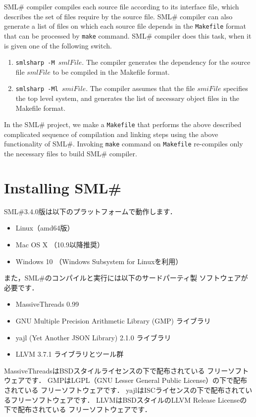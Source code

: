 \documentclass{jbook}
\newcommand{\txt}[2]{#2}
\newcommand{\smlsharp}{SML\#}
\newcommand{\version}{3.4.0}
\begin{document}
	\smlsharp{} compiler compiles each source file according to its
interface file, which describes the set of files require by the source
file.
	\smlsharp{} compiler can also generate a list of files on which
each source file depends in the {\tt Makefile} format that can be
processed by {\tt make} command. 
	\smlsharp{} compiler does this task, when it is given one of the
following switch.

\begin{enumerate}
\item {\tt smlsharp -M $\mathit{smlFile}$}.
	The compiler generates the dependency for the source file
$\mathit{smlFile}$ to be compiled in the Makefile format. 
\item {\tt smlsharp -Ml $\mathit{smiFile}$}.
	The compiler assumes that the file $\mathit{smiFile}$ specifies the
top level system, and generates the list of necessary object files in the
Makefile format. 
\end{enumerate}	

	In the \smlsharp{} project, we make a {\tt Makefile} that
performs the above described complicated sequence of compilation and
linking steps using the above functionality of \smlsharp{}.
	Invoking {\tt make} command on {\tt Makefile} re-compiles only
the necessary files to build \smlsharp{} compiler.
\fi%

\section{
\txt{\smlsharp{}のインストール}
    {Installing \smlsharp{}}}
\label{sec:tutorialInstall}

\ifjp%
	\smlsharp{}\version{}版は以下のプラットフォームで動作します．
\begin{itemize}
\item Linux（amd64版）
\item Mac OS X （10.9以降推奨）
\item Windows 10 （Windows Subsystem for Linuxを利用）
\end{itemize}

	また，\smlsharp{}のコンパイルと実行には以下のサードパーティ製
ソフトウェアが必要です．
\begin{itemize}
\item MassiveThreads 0.99
\item GNU Multiple Precision Arithmetic Library (GMP) ライブラリ
\item yajl (Yet Another JSON Library) 2.1.0 ライブラリ
\item LLVM 3.7.1 ライブラリとツール群
\end{itemize}
	MassiveThreadsはBSDスタイルライセンスの下で配布されている
フリーソフトウェアです．
	GMPはLGPL（GNU Lesser General Public License）の下で配布されている
フリーソフトウェアです．
	yajlはISCライセンスの下で配布されているフリーソフトウェアです．
	LLVMはBSDスタイルのLLVM Release Licenseの下で配布されている
フリーソフトウェアです．
\end{document}
